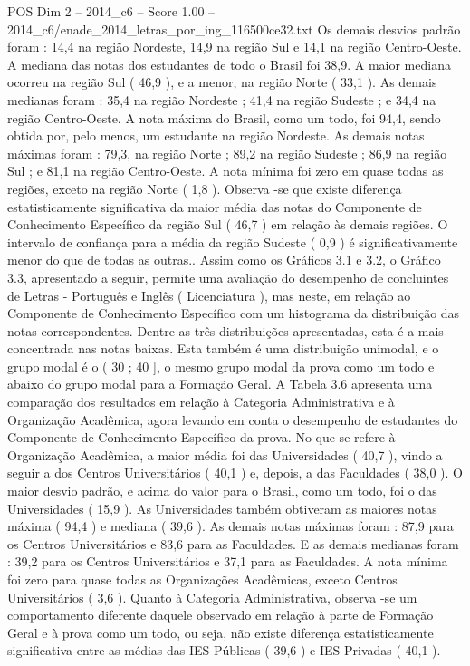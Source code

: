\begin{textsample}{POS Dim 2 – 2014\_c6 – Score 1.00 – 2014\_c6/enade\_2014\_letras\_por\_ing\_116500ce32.txt}
Os demais desvios padrão foram : 14,4 na região Nordeste, 14,9 na região Sul e 14,1 na região Centro-Oeste.
A mediana das notas dos estudantes de todo o Brasil foi 38,9.
A maior mediana ocorreu na região Sul ( 46,9 ), e a menor, na região Norte ( 33,1 ).
As demais medianas foram : 35,4 na região Nordeste ; 41,4 na região Sudeste ; e 34,4 na região Centro-Oeste.
A nota máxima do Brasil, como um todo, foi 94,4, sendo obtida por, pelo menos, um estudante na região Nordeste.
As demais notas máximas foram : 79,3, na região Norte ; 89,2 na região Sudeste ; 86,9 na região Sul ; e 81,1 na região Centro-Oeste.
A nota mínima foi zero em quase todas as regiões, exceto na região Norte ( 1,8 ).
Observa -se que existe diferença estatisticamente significativa da maior média das notas do Componente de Conhecimento Específico da região Sul ( 46,7 ) em relação às demais regiões.
O intervalo de confiança para a média da região Sudeste ( 0,9 ) é significativamente menor do que de todas as outras..
Assim como os Gráficos 3.1 e 3.2, o Gráfico 3.3, apresentado a seguir, permite uma avaliação do desempenho de concluintes de Letras - Português e Inglês ( Licenciatura ), mas neste, em relação ao Componente de Conhecimento Específico com um histograma da distribuição das notas correspondentes.
Dentre as três distribuições apresentadas, esta é a mais concentrada nas notas baixas.
Esta também é uma distribuição unimodal, e o grupo modal é o ( 30 ; 40 ], o mesmo grupo modal da prova como um todo e abaixo do grupo modal para a Formação Geral.
A Tabela 3.6 apresenta uma comparação dos resultados em relação à Categoria Administrativa e à Organização Acadêmica, agora levando em conta o desempenho de estudantes do Componente de Conhecimento Específico da prova.
No que se refere à Organização Acadêmica, a maior média foi das Universidades ( 40,7 ), vindo a seguir a dos Centros Universitários ( 40,1 ) e, depois, a das Faculdades ( 38,0 ).
O maior desvio padrão, e acima do valor para o Brasil, como um todo, foi o das Universidades ( 15,9 ).
As Universidades também obtiveram as maiores notas máxima ( 94,4 ) e mediana ( 39,6 ).
As demais notas máximas foram : 87,9 para os Centros Universitários e 83,6 para as Faculdades.
E as demais medianas foram : 39,2 para os Centros Universitários e 37,1 para as Faculdades.
A nota mínima foi zero para quase todas as Organizações Acadêmicas, exceto Centros Universitários ( 3,6 ).
Quanto à Categoria Administrativa, observa -se um comportamento diferente daquele observado em relação à parte de Formação Geral e à prova como um todo, ou seja, não existe diferença estatisticamente significativa entre as médias das IES Públicas ( 39,6 ) e IES Privadas ( 40,1 ).

\end{textsample}
